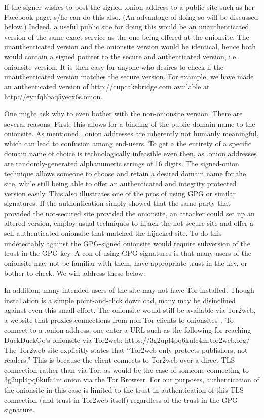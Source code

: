 \documentclass[10pt, conference, compsocconf]{styles/IEEEtran}
\begin{document}
If the signer wishes to post the signed .onion address to a public
site such as her Facebook page, s/he can do this also. (An advantage
of doing so will be discussed below.) Indeed, a
useful public site for doing this would be an unauthenticated version
of the same exact service as the one being offered at the onionsite.
The unauthenticated version and the onionsite version would be
identical, hence both would contain a signed pointer to the secure and
authenticated version, i.e., onionsite version. It is then
easy for anyone who desires to check if the unauthenticated version
matches the secure version. For example, we have made an authenticated
version of http://cupcakebridge.com available at http://eynfqhbaq5yecx6s.onion.

One might ask why to even bother with the non-onionsite version. There
are several reasons. First, this allows for a binding of the public
domain name to the onionsite. As mentioned, .onion addresses are
inherently not humanly meaningful, which can lead to confusion among 
end-users.  To get a the entirety of a specific domain name of choice is
technologically infeasible even then, as .onion addresses are
randomly-generated alphanumeric strings of 16 digits. The signed-onion
technique allows someone to choose and retain a desired domain name for the
site, while still being able to offer an authenticated and integrity
protected version easily. This also illustrates one of the pros
of using GPG or similar signatures. If the authentication simply
showed that the same party that provided the not-secured site
provided the onionsite, an attacker could set up an altered version,
employ usual techniques to hijack the not-secure site and offer
a self-authenticated onionsite that matched the hijacked site.
To do this undetectably against the GPG-signed onionsite would require
subversion of the trust in the GPG key. A con of using GPG signatures
is that many users of the onionsite may not be familiar with them,
have appropriate trust in the key, or bother to check. We will address
these below.

In addition, many intended users of the site may not have Tor installed.
Though installation is a simple point-and-click download, many may be
disinclined against even this small effort. The onionsite would still
be available via Tor2web, a website that proxies connections from
non-Tor clients to onionsites~\cite{tor2web}.  To connect to a .onion
address, one enter a URL such as the following for reaching
DuckDuckGo's onionsite via Tor2web:
https://3g2upl4pq6kufc4m.tor2web.org/ The Tor2web site explicitly
states that ``Tor2web only protects publishers, not readers.'' This is
because the client connects to Tor2web over a direct TLS connection
rather than via Tor, as would be the case of someone connecting to
3g2upl4pq6kufc4m.onion via the Tor Browser.  For our purposes,
authentication of the onionsite in this case is limited to the trust
in authentication of this TLS connection (and trust in Tor2web itself)
regardless of the trust in the GPG signature.
\end{document}
